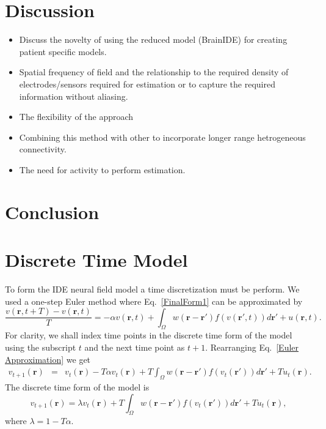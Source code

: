 \documentclass[onecolumn,draftcls]{IEEEtran}
\begin{document}
\section{Discussion}
\begin{itemize}

	\item Discuss the novelty of using the reduced model (BrainIDE) for creating patient specific models. 

	\item Spatial frequency of field and the relationship to the required density of electrodes/sensors required for estimation or to capture the required information without aliasing.
	
	\item The flexibility of the approach
	
	\item Combining this method with other to incorporate longer range hetrogeneous connectivity.
	
	\item The need for activity to perform estimation.
\end{itemize}

\section{Conclusion}

\appendices

\section{Discrete Time Model}\label{Time Discretization}
To form the IDE neural field model a time discretization must be perform. We used a one-step Euler method where Eq.~\ref{FinalForm1} can be approximated by
\begin{equation}\label{Euler Approximation}	
\frac{v\left( \mathbf{r},t+T \right) - v\left( \mathbf{r},t\right)}{T} =   -\alpha v\left( \mathbf{r},t \right) + \int_\Omega  {w\left( \mathbf{r}-\mathbf{r}' \right)f\left( {v\left( \mathbf{r}',t \right)} \right)d\mathbf{r}'} + u\left(\mathbf{r},t\right).
\end{equation}
For clarity, we shall index time points in the discrete time form of the model using the subscript $t$ and the next time point as $t+1$. Rearranging Eq.~\ref{Euler Approximation} we get
\begin{eqnarray}\label{Euler Approximation}	
v_{t+1}\left( \mathbf{r}\right) &=& v_t\left( \mathbf{r}\right) -T \alpha v_t\left( \mathbf{r}\right) + T \int_\Omega  {w\left( \mathbf{r}-\mathbf{r}' \right)f\left( {v_t\left( \mathbf{r}'\right)} \right)d\mathbf{r}'} + T u_t\left(\mathbf{r}\right).
\end{eqnarray}
The discrete time form of the model is
\begin{equation}\label{Discrete Time Model1}
	v_{t+1}\left(\mathbf{r}\right) = \lambda v_t\left(\mathbf{r}\right) + T \int_\Omega { w\left(\mathbf{r}-\mathbf{r}'\right) f\left(v_t\left(\mathbf{r}'\right)\right) d\mathbf{r}'} + T u_t\left(\mathbf{r}\right),
\end{equation}
where $\lambda = 1 - T \alpha$.
\end{document}
